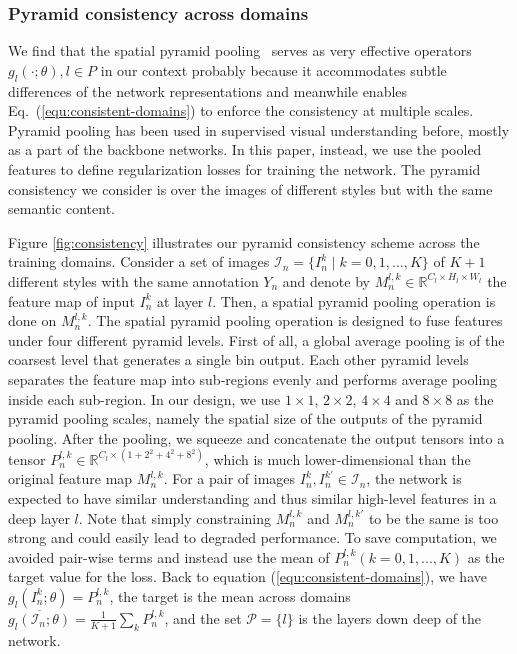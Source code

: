 \documentclass[10pt,twocolumn,letterpaper]{article}
\begin{document}
\subsubsection{Pyramid consistency across domains} 
\label{subsubsec:consistency_across_domains}
We find that the spatial pyramid pooling~\cite{he2014spatial, pspnet, pyramid_ori} serves as very effective operators $g_l(\cdot;\theta), l\in P$ in our context probably because it accommodates subtle differences of the network representations and meanwhile enables Eq.~(\ref{equ:consistent-domains}) to enforce the consistency at multiple scales. Pyramid pooling has been used in supervised visual understanding before, mostly as a part of the backbone networks. In this paper, instead, we use the pooled features to define regularization losses for training the network. The  pyramid consistency we consider is  over the images of different styles but with the same semantic content. 



Figure \ref{fig:consistency} illustrates our pyramid consistency scheme across the training domains. Consider a set of images $\mathcal{I}_n = \{I^k_n \mid k=0,1,\dots, K\}$ of $K+1$ different styles with the same annotation $Y_n$ and denote by  $M^{l,k}_n \in \mathbb{R}^{C_l \times H_l \times W_l}$ the feature map of input $I_n^k$ at layer $l$. Then, a spatial pyramid pooling operation is done on $M^{l,k}_n$. The spatial pyramid pooling operation is designed to fuse features under four different pyramid levels. First of all, a global average pooling is of the coarsest level that generates a single bin output. Each other pyramid levels separates the feature map into sub-regions evenly and performs average pooling inside each sub-region. In our design, we use $1\times 1$, $2\times2$, $4\times4$ and $8\times8$ as the pyramid pooling scales, namely the spatial size of the outputs of the pyramid pooling. After the pooling, we squeeze and concatenate the output tensors into a tensor $P^{l,k}_n \in \mathbb{R}^{C_l\times\left(1+2^2+4^2+8^2\right)}$, which is much lower-dimensional than the original feature map $M_n^{l,k}$. For a pair of images $I_n^{k}, I_n^{k'} \in \mathcal{I}_n$, the network is expected to have similar understanding and thus similar high-level features in a deep layer $l$. Note that simply constraining $M_n^{l,k}$ and $M_n^{l,k'}$ to be the same is too strong and could easily lead to degraded performance. To save computation, we avoided pair-wise terms and instead use the mean of $P_n^{l,k} (k=0,1,...,K)$ as the target value for the loss. Back to equation (\ref{equ:consistent-domains}), we have $g_l(I_n^k;\theta) = P_n^{l,k}$, the target is the mean across domains $\overline{g_l(\mathcal{I}_n;\theta)}=\frac{1}{K+1}\sum_k P_n^{l,k}$, and the set $\mathcal{P}=\{l\}$ is the layers down deep of the network. 
\end{document}
